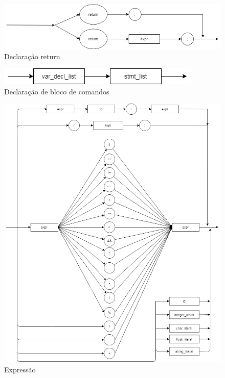 \documentclass[]{article}
\numberwithin{equation}{section}
\begin{document}
\begin{center}
\begin{figure}[h!]
  \includegraphics[width=\linewidth]{./assets/return_stmt.png}
  \caption{Declaração return}
\end{figure}
\end{center}

\begin{center}
\begin{figure}[h!]
  \includegraphics[width=\linewidth]{./assets/decl_block.png}
  \caption{Declaração de bloco de comandos}
\end{figure}
\end{center}

\begin{center}
\begin{figure}[h!]
  \includegraphics[width=\linewidth]{./assets/expr.png}
  \caption{Expressão}
\end{figure}
\end{center}
\end{document}
